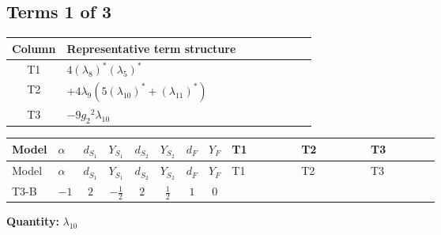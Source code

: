 \documentclass[8pt]{article}
\begin{document}
\begin{landscape}
\subsection*{Terms 1 of 3}
\begin{center}
\begin{tabular}{@{}c >{\raggedright\arraybackslash}p{0.82\linewidth}@{}}
\toprule
Column & Representative term structure \\
\midrule
T1 & \(\displaystyle 4 \left({\lambda_{8}}\right)^{*} \left({\lambda_5}\right)^{*}\) \\
\midrule
T2 & \(\displaystyle +4 {\lambda_{9}} (5 \left({\lambda_{10}}\right)^{*}+\left({\lambda_{11}}\right)^{*})\) \\
\midrule
T3 & \(\displaystyle -9 {g_2}^2 {\lambda_{10}}\) \\
\midrule
\bottomrule
\end{tabular}
\end{center}
\smallskip
\tiny
\begin{longtable}{@{}llcccccc >{\raggedright\arraybackslash}p{0.21\linewidth} >{\raggedright\arraybackslash}p{0.21\linewidth} >{\raggedright\arraybackslash}p{0.21\linewidth}@{}}
\toprule
Model & $\alpha$ & $d_{S_1}$ & $Y_{S_1}$ & $d_{S_2}$ & $Y_{S_2}$ & $d_F$ & $Y_F$ & T1 & T2 & T3 \\
\midrule
\endfirsthead
\toprule
Model & $\alpha$ & $d_{S_1}$ & $Y_{S_1}$ & $d_{S_2}$ & $Y_{S_2}$ & $d_F$ & $Y_F$ & T1 & T2 & T3 \\
\midrule
\endhead
T3-B & $-1$ & $2$ & $-\frac{1}{2}$ & $2$ & $\frac{1}{2}$ & $1$ & $0$ & \scriptsize\adjustbox{max width=\linewidth}{$\begin{gathered} 4 \left({\lambda_{8}}\right)^{*} \left({\lambda_5}\right)^{*}\end{gathered}$} & \scriptsize\adjustbox{max width=\linewidth}{$\begin{gathered} +4 {\lambda_{9}} (5 \left({\lambda_{10}}\right)^{*}+\left({\lambda_{11}}\right)^{*})\end{gathered}$} & \scriptsize\adjustbox{max width=\linewidth}{$\begin{gathered} -9 {g_2}^2 {\lambda_{10}}\end{gathered}$} \\
\midrule
\bottomrule
\end{longtable}
\clearpage
\noindent\textbf{Quantity: }$\lambda_{10}$\par\smallskip

\end{landscape}
\end{document}
